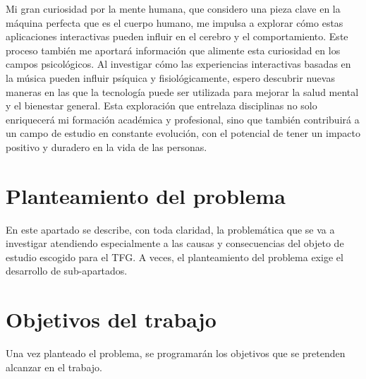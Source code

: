 Mi gran curiosidad por la mente humana, que considero una pieza clave en la máquina perfecta que es el cuerpo humano, me impulsa a explorar cómo estas aplicaciones interactivas pueden influir en el cerebro y el comportamiento. Este proceso también me aportará información que alimente esta curiosidad en los campos psicológicos. Al investigar cómo las experiencias interactivas basadas en la música pueden influir psíquica y fisiológicamente, espero descubrir nuevas maneras en las que la tecnología puede ser utilizada para mejorar la salud mental y el bienestar general. Esta exploración que entrelaza disciplinas no solo enriquecerá mi formación académica y profesional, sino que también contribuirá a un campo de estudio en constante evolución, con el potencial de tener un impacto positivo y duradero en la vida de las personas.

\section{Planteamiento del problema}

En este apartado se describe, con toda claridad, la problemática que se va a investigar atendiendo especialmente a las causas y consecuencias del objeto de estudio escogido para el TFG. A veces, el planteamiento del problema exige el desarrollo de sub-apartados.

\section{Objetivos del trabajo}

Una vez planteado el problema, se programarán los objetivos que se pretenden alcanzar en el trabajo.
